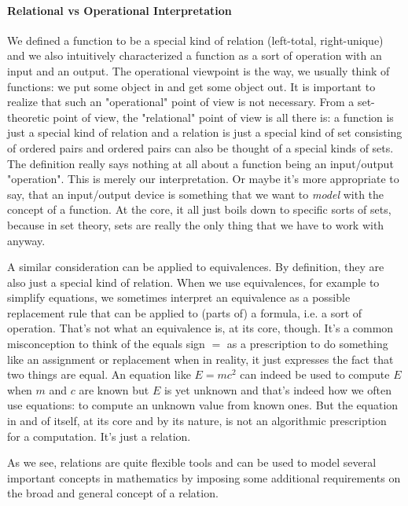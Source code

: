 \paragraph{Relational vs Operational Interpretation}
We defined a function to be a special kind of relation (left-total, right-unique) and we also intuitively characterized a function as a sort of operation with an input and an output. The operational viewpoint is the way, we usually think of functions: we put some object in and get some object out. It is important to realize that such an "operational" point of view is not necessary. From a set-theoretic point of view, the "relational" point of view is all there is: a function is just a special kind of relation and a relation is just a special kind of set consisting of ordered pairs and ordered pairs can also be thought of a special kinds of sets. The definition really says nothing at all about a function being an input/output "operation". This is merely our interpretation. Or maybe it's more appropriate to say, that an input/output device is something that we want to \emph{model} with the concept of a function. At the core, it all just boils down to specific sorts of sets, because in set theory, sets are really the only thing that we have to work with anyway.

\medskip
A similar consideration can be applied to equivalences. By definition, they are also just a special kind of relation. When we use equivalences, for example to simplify equations, we sometimes interpret an equivalence as a possible replacement rule that can be applied to (parts of) a formula, i.e. a sort of operation. That's not what an equivalence is, at its core, though. It's a common misconception to think of the equals sign $=$ as a prescription to do something like an assignment or replacement when in reality, it just expresses the fact that two things are equal. An equation like $E = m c^2$ can indeed be used to compute $E$ when $m$ and $c$ are known but $E$ is yet unknown and that's indeed how we often use equations: to compute an unknown value from known ones. But the equation in and of itself, at its core and by its nature, is not an algorithmic prescription for a computation. It's just a relation.

\medskip
As we see, relations are quite flexible tools and can be used to model several important concepts in mathematics by imposing some additional requirements on the broad and general concept of a relation.

